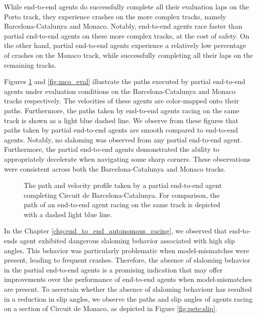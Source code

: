 

While end-to-end agents do successfully complete all their evaluation laps on the Porto track, they experience crashes on the more complex tracks, namely Barcelona-Catalunya and Monaco.
Notably, end-to-end agents race faster than partial end-to-end agents on these more complex tracks, at the cost of safety.
On the other hand, partial end-to-end agents experience a relatively low percentage of crashes on the Monaco track, while successfully completing all their laps on the remaining tracks.


Figures \ref{fig:esp_eval} and \ref{fig:mco_eval} illustrate the paths executed by partial end-to-end agents under evaluation conditions on the Barcelona-Catalunya and Monaco tracks respectively.
The velocities of these agents are color-mapped onto their paths.
Furthermore, the paths taken by end-to-end agents racing on the same track is shown as a light blue dashed line.
We observe from these figures that paths taken by partial end-to-end agents are smooth compared to end-to-end agents.
Notably, no slaloming was observed from any partial end-to-end agent.
Furthermore, the partial end-to-end agents demonstrated the ability to appropriately decelerate when navigating some sharp corners.
These observations were consistent across both the Barcelona-Catalunya and Monaco tracks.

\begin{figure}[htb!]
    \centering
    
    \caption[The path and velocity profile taken by a partial end-to-end agent completing Circuit de Barcelona-Catalunya]{The path and velocity profile taken by a partial end-to-end agent completing Circuit de Barcelona-Catalunya. For comparison, the path of an end-to-end agent racing on the same track is depicted with a dashed light blue line.}
    \label{fig:esp_eval}
\end{figure}


In the Chapter \ref{chp:end_to_end_autonomous_racing}, we observed that end-to-ends agent exhibited dangerous slaloming behavior associated with high slip angles. 
This behavior was particularly problematic when model-mismatches were present, leading to frequent crashes.
Therefore, the absence of slaloming behavior in the partial end-to-end agents is a promising indication that may offer improvements over the performance of end-to-end agents  when model-mismatches are present. 
To ascertain whether the absence of slaloming behaviour has resulted in a reduction in slip angles, we observe the paths and slip angles of agents racing on a section of Circuit de Monaco, as depicted in Figure \ref{fig:pete:slip}.

